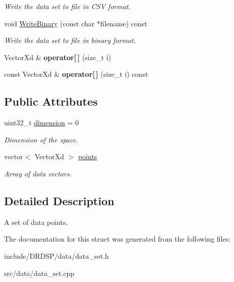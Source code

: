 \begin{DoxyCompactItemize}
\begin{DoxyCompactList}\small\item\em Write the data set to file in C\-S\-V format. \end{DoxyCompactList}\item 
\hypertarget{struct_d_r_d_s_p_1_1_data_set_a3003901476d4b92d122a64d78d67e212}{void \hyperlink{struct_d_r_d_s_p_1_1_data_set_a3003901476d4b92d122a64d78d67e212}{Write\-Binary} (const char $\ast$filename) const }\label{struct_d_r_d_s_p_1_1_data_set_a3003901476d4b92d122a64d78d67e212}

\begin{DoxyCompactList}\small\item\em Write the data set to file in binary format. \end{DoxyCompactList}\item 
\hypertarget{struct_d_r_d_s_p_1_1_data_set_a6124959ad62a522b65cf6ad715166354}{Vector\-Xd \& {\bfseries operator\mbox{[}$\,$\mbox{]}} (size\-\_\-t i)}\label{struct_d_r_d_s_p_1_1_data_set_a6124959ad62a522b65cf6ad715166354}

\item 
\hypertarget{struct_d_r_d_s_p_1_1_data_set_aea3071fb03508e07e4d39056247eaaf9}{const Vector\-Xd \& {\bfseries operator\mbox{[}$\,$\mbox{]}} (size\-\_\-t i) const }\label{struct_d_r_d_s_p_1_1_data_set_aea3071fb03508e07e4d39056247eaaf9}

\end{DoxyCompactItemize}
\subsection*{Public Attributes}
\begin{DoxyCompactItemize}
\item 
\hypertarget{struct_d_r_d_s_p_1_1_data_set_aa2598262725329c137e03b8947638780}{uint32\-\_\-t \hyperlink{struct_d_r_d_s_p_1_1_data_set_aa2598262725329c137e03b8947638780}{dimension} = 0}\label{struct_d_r_d_s_p_1_1_data_set_aa2598262725329c137e03b8947638780}

\begin{DoxyCompactList}\small\item\em Dimension of the space. \end{DoxyCompactList}\item 
\hypertarget{struct_d_r_d_s_p_1_1_data_set_ac486c907dea215957d503dc4dc9d76e3}{vector$<$ Vector\-Xd $>$ \hyperlink{struct_d_r_d_s_p_1_1_data_set_ac486c907dea215957d503dc4dc9d76e3}{points}}\label{struct_d_r_d_s_p_1_1_data_set_ac486c907dea215957d503dc4dc9d76e3}

\begin{DoxyCompactList}\small\item\em Array of data vectors. \end{DoxyCompactList}\end{DoxyCompactItemize}


\subsection{Detailed Description}
A set of data points. 

The documentation for this struct was generated from the following files\-:\begin{DoxyCompactItemize}
\item 
include/\-D\-R\-D\-S\-P/data/data\-\_\-set.\-h\item 
src/data/data\-\_\-set.\-cpp\end{DoxyCompactItemize}
